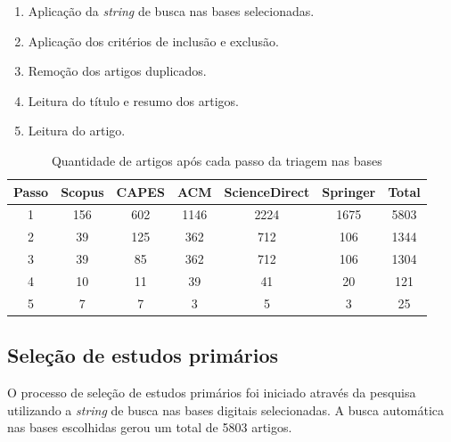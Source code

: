 \begin{enumerate}
	\item Aplicação da \textit{string} de busca nas bases selecionadas. %
	
	\item Aplicação dos critérios de inclusão e exclusão. %
	
	\item Remoção dos artigos duplicados. %
	
	\item Leitura do título e resumo dos artigos. %
	
	\item Leitura do artigo. %
\end{enumerate} 

\begin{table}[h!]
	\centering
	\label{tab:triagem}
	\begin{tabular}{|c|c|c|c|c|c|c|}
		\hline
		\textbf{Passo} & \textbf{Scopus} & \textbf{CAPES} & \textbf{ACM} & \textbf{ScienceDirect} & \textbf{Springer} & \textbf{Total} \\ \hline
		1 & 156 & 602 & 1146 & 2224 & 1675 & 5803\\ \hline
		2 & 39 & 125 & 362 & 712 & 106 & 1344\\ \hline
		3 & 39 & 85 & 362 & 712 & 106 & 1304\\ \hline
		4 & 10 & 11 & 39 & 41 & 20 & 121\\ \hline
		5 & 7 & 7 & 3 & 5 & 3 & 25 \\ \hline
	\end{tabular}
	\caption{Quantidade de artigos após cada passo da triagem nas bases}
\end{table}


\subsection{Seleção de estudos primários}

O processo de seleção de estudos primários foi iniciado através da pesquisa utilizando a \textit{string} de busca nas bases digitais selecionadas. A busca automática nas bases escolhidas gerou um total de 5803 artigos.

